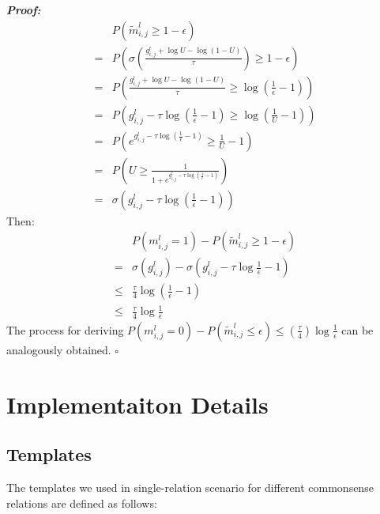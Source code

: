 \noindent
\textit{\textbf{Proof:}}
\begin{align}
	&P(\tilde{m}_{i,j}^l\geq 1-\epsilon) \\
	=&P(\sigma(\frac{g_{i,j}^l+\log{U}-\log{(1-U)}}{\tau}) \geq 1-\epsilon)\\
	=&P(\frac{g_{i,j}^l+\log{U}-\log{(1-U)}}{\tau} \geq \log{(\frac{1}{\epsilon}-1)}) \\
	=&P(g_{i,j}^l-\tau \log{(\frac{1}{\epsilon}-1)}\geq \log{(\frac{1}{U}-1)})\\
	=&P(e^{g_{i,j}^l-\tau \log{(\frac{1}{\epsilon}-1)}} \geq \frac{1}{U}-1)\\
	=&P(U\geq \frac{1}{1+e^{g_{i,j}^l-\tau \log{(\frac{1}{\epsilon}-1)}}})\\
	=&\sigma(g_{i,j}^l-\tau \log{(\frac{1}{\epsilon}-1)})
\end{align}
Then:
\begin{align}
	&P(m_{i,j}^l=1) - P(\tilde{m}_{i,j}^l\geq 1-\epsilon)\\
	=&\sigma(g_{i,j}^l)-\sigma(g_{i,j}^l-\tau \log{\frac{1}{\epsilon}-1})\\
	\leq&\frac{\tau}{4} \log{(\frac{1}{\epsilon}-1)} \\
	\leq&\frac{\tau}{4} \log{\frac{1}{\epsilon}}
\end{align}
The process for deriving $P(m_{i,j}^l=0) - P(\tilde{m}_{i,j}^l\leq \epsilon) \leq (\frac{\tau}{4})\log{\frac{1}{\epsilon}}$ can be analogously obtained.
$\square$

\section{Implementaiton Details}
\subsection{Templates}
The templates we used in single-relation scenario for different commonsense relations are defined as follows:

